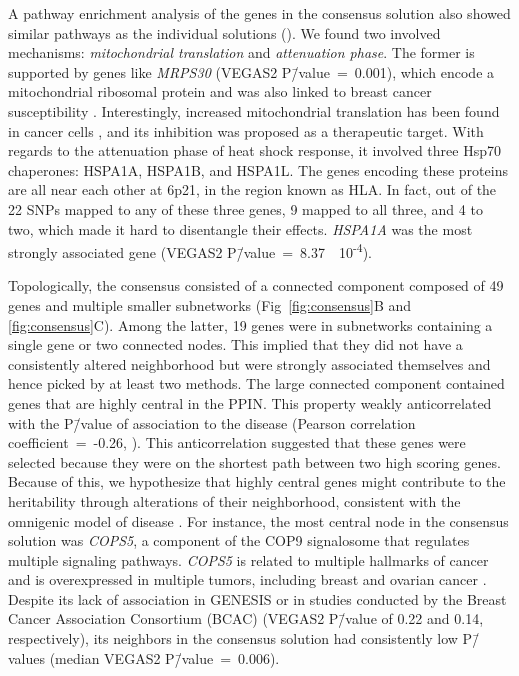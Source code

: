 \documentclass[10pt,letterpaper]{article}
\begin{document}
A pathway enrichment analysis of the genes in the consensus solution also showed similar pathways as the individual solutions (). We found two involved mechanisms: \emph{mitochondrial translation} and \emph{attenuation phase}. The former is supported by genes like \emph{MRPS30} (VEGAS2 P\=/value~=~0.001), which encode a mitochondrial ribosomal protein and was also linked to breast cancer susceptibility \cite{quigley_5p12_2014}. Interestingly, increased mitochondrial translation has been found in cancer cells \cite{Yu2016Repositioning}, and its inhibition was proposed as a therapeutic target. With regards to the attenuation phase of heat shock response, it involved three Hsp70 chaperones: HSPA1A, HSPA1B, and HSPA1L. The genes encoding these proteins are all near each other at 6p21, in the region known as HLA. In fact, out of the 22 SNPs mapped to any of these three genes, 9 mapped to all three, and 4 to two, which made it hard to disentangle their effects. \emph{HSPA1A} was the most strongly associated gene (VEGAS2 P\=/value~=~8.37~\texttimes{}~10\textsuperscript{-4}).  

Topologically, the consensus consisted of a connected component composed of 49 genes and multiple smaller subnetworks (Fig~\ref{fig:consensus}B and \ref{fig:consensus}C). Among the latter, 19 genes were in subnetworks containing a single gene or two connected nodes. This implied that they did not have a consistently altered neighborhood but were strongly associated themselves and hence picked by at least two methods. The large connected component contained genes that are highly central in the PPIN. This property weakly anticorrelated with the P\=/value of association to the disease (Pearson correlation coefficient~=~-0.26, ). This anticorrelation suggested that these genes were selected because they were on the shortest path between two high scoring genes. Because of this, we hypothesize that highly central genes might contribute to the heritability through alterations of their neighborhood, consistent with the omnigenic model of disease \cite{boyle_expanded_2017}. For instance, the most central node in the consensus solution was \emph{COPS5}, a component of the COP9 signalosome that regulates multiple signaling pathways. \emph{COPS5} is related to multiple hallmarks of cancer and is overexpressed in multiple tumors, including breast and ovarian cancer \cite{liu_jab1_cops5_2018}. Despite its lack of association in GENESIS or in studies conducted by the Breast Cancer Association Consortium (BCAC) \cite{Michailidou2017} (VEGAS2 P\=/value of 0.22 and 0.14, respectively), its neighbors in the consensus solution had consistently low P\=/values (median VEGAS2 P\=/value~=~0.006).
\end{document}
